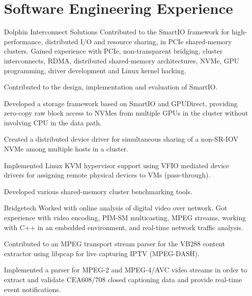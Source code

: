 \section{Software Engineering Experience}
\begin{experience}{Dolphin Interconnect Solutions}{
}
Contributed to the SmartIO framework for high-performance, distributed I/O and resource sharing,
in PCIe shared-memory clusters. 
Gained experience with PCIe, non-transparent bridging, cluster interconnects, RDMA, distributed shared-memory
architectures, NVMe, GPU programming, driver development and Linux kernel hacking.
\begin{contribs}
	\item{Contributed to the design, implementation and evaluation of SmartIO.}
	\item{Developed a storage framework based on SmartIO and GPUDirect, providing
		zero-copy raw block access to NVMes from multiple GPUs in the cluster without involving CPU in the data path.}
	\item{Created a distributed device driver for simultaneous sharing of a non-SR-IOV NVMe among multiple hosts in a cluster.}
	\item{Implemented Linux KVM hypervisor support using VFIO mediated device drivers
		for assigning remote physical devices to VMs (pass-through).}
	\item{Developed various shared-memory cluster benchmarking tools.}
\end{contribs}
\end{experience}

\begin{experience}{Bridgetech}{
}
Worked with online analysis of digital video over network.
Got experience with video encoding, PIM-SM multicasting, MPEG 
streams, working with C++ in an embedded environment, and
real-time network traffic analysis.

\begin{contribs}
	\item{Contributed to an MPEG transport stream parser for the VB288 content extractor using libpcap for live capturing
		IPTV (MPEG-DASH).}
	\item{Implemented a parser for MPEG-2 and MPEG-4/AVC video streams in order to extract and
		validate CEA608/708 closed captioning data and provide real-time event
		notifications.}
\end{contribs}
\end{experience}

